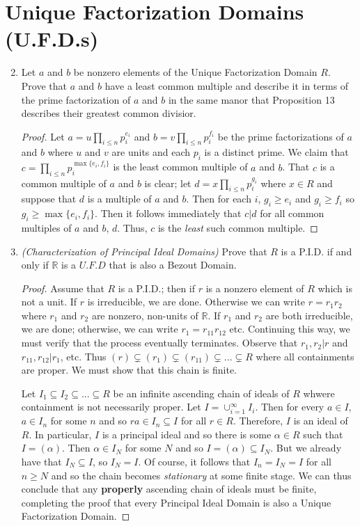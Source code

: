 \documentclass{report}
\newcommand{\R}{\mathbb{R}}
\begin{document}
\section{Unique Factorization Domains (U.F.D.s)} 
\begin{enumerate}
	\setcounter{enumi}{1}
	\item Let $a$ and $b$ be nonzero elements of the Unique Factorization Domain $R$.
	Prove that $a$ and $b$ have a least common multiple and describe it in terms of the prime factorization of $a$ and $b$ 
	in the same manor that Proposition 13 describes their greatest common divisior.
	\begin{proof}
		Let $a=u\prod_{i\leq n} p_i^{e_i}$ and $b=v\prod_{i\leq n} p_i^{f_i}$ be the prime factorizations of $a$ and $b$ 
		where $u$ and $v$ are units and each $p_i$ is a distinct prime.
		We claim that $c=\prod_{i\leq n} p_i^{\max\{e_i,f_i\}}$ is the least common multiple of $a$ and $b$.
		That $c$ is a common multiple of $a$ and $b$ is clear; let $d=x\prod_{i\leq n}p_i^{g_i}$ where $x\in R$
		and suppose that $d$ is a multiple of $a$ and $b$. Then for each $i$, $g_i\geq e_i$ and $g_i\geq f_i$ so $g_i\geq \max\{e_i,f_i\}$.
		Then it follows immediately that $c|d$ for all common multiples of $a$ and $b$, $d$.
		Thus, $c$ is the \textit{least} such common multiple.
	\end{proof}
	\setcounter{enumi}{10}
	\item \textit{(Characterization of Principal Ideal Domains)} Prove that $R$ is a P.I.D. if and only if $\R$ is a $U.F.D$ that is also a Bezout Domain.
	\begin{proof}
	   Assume that $R$ is a P.I.D.; then if $r$ is a nonzero element of $R$ which is not a unit.
	   If $r$ is irreducible, we are done. Otherwise we can write $r=r_1r_2$ where $r_1$ and $r_2$ are nonzero, non-units of $\R$.
	   If $r_1$ and $r_2$ are both irreducible, we are done; otherwise, we can write $r_1=r_{11}r_{12}$ etc.
	   Continuing this way, we must verify that the process eventually terminates.
	   Observe that $r_1,r_2|r$ and $r_{11},r_{12}|r_1$, etc. Thus $(r)\subsetneq(r_1)\subsetneq(r_{11})\subsetneq...\subsetneq R$ where all containments are proper.
	   We must show that this chain is finite.
	   \bigskip

	   \noindent
	   Let $I_1\subseteq I_2\subseteq...\subseteq R$ be an infinite ascending chain of ideals of $R$ whwere containment is not necessarily proper.
	   Let $I=\cup_{i=1}^\infty I_i$. Then for every $a\in I$, $a\in I_n$ for some $n$ and so $ra\in I_n\subseteq I$ for all $r\in R$.
	   Therefore, $I$ is an ideal of $R$. In particular, $I$ is a principal ideal and so there is some $\alpha \in R$ such that $I=(\alpha)$.
	   Then $\alpha\in I_N$ for some $N$ and so $I=(\alpha)\subseteq I_N$. But we already have that $I_N\subseteq I$, so $I_N=I$.
	   Of course, it follows that $I_n=I_N=I$ for all $n\geq N$ and so the chain becomes \textit{stationary} at some finite stage.
	   We can thus conclude that any \textbf{properly} ascending chain of ideals must be finite,
	   completing the proof that every Principal Ideal Domain is also a Unique Factorization Domain.
	   \bigskip


\end{proof}
\end{enumerate}
\end{document}
